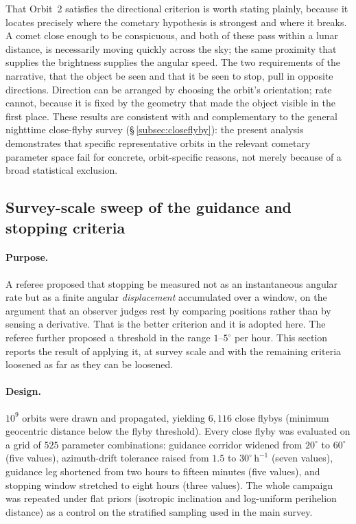 \documentclass[11pt,a4paper]{article}
\begin{document}
That Orbit~2 satisfies the directional criterion is worth stating plainly,
because it locates precisely where the cometary hypothesis is strongest and
where it breaks.  A comet close enough to be conspicuous, and both of these
pass within a lunar distance, is necessarily moving quickly across the sky;
the same proximity that supplies the brightness supplies the angular speed.
The two requirements of the narrative, that the object be seen and that it
be seen to stop, pull in opposite directions.  Direction can be arranged by
choosing the orbit's orientation; rate cannot, because it is fixed by the
geometry that made the object visible in the first place.
These results are consistent with and complementary to the general
nighttime close-flyby survey (\S\,\ref{subsec:closeflyby}):
the present analysis demonstrates that specific representative orbits in
the relevant cometary parameter space fail for concrete, orbit-specific
reasons, not merely because of a broad statistical exclusion.

\subsection{Survey-scale sweep of the guidance and stopping criteria}
\label{subsec:sweep}

\paragraph{Purpose.}
A referee proposed that stopping be measured not as an instantaneous angular
rate but as a finite angular \emph{displacement} accumulated over a window, on
the argument that an observer judges rest by comparing positions rather than by
sensing a derivative. That is the better criterion and it is adopted here. The
referee further proposed a threshold in the range $1$--$5^\circ$ per hour. This
section reports the result of applying it, at survey scale and with the
remaining criteria loosened as far as they can be loosened.

\paragraph{Design.}
$10^{9}$ orbits were drawn and propagated, yielding $6{,}116$ close flybys
(minimum geocentric distance below the flyby threshold). Every close flyby was
evaluated on a grid of $525$ parameter combinations: guidance corridor widened
from $20^\circ$ to $60^\circ$ (five values), azimuth-drift tolerance raised from
$1.5$ to $30^\circ\,\mathrm{h}^{-1}$ (seven values), guidance leg shortened from
two hours to fifteen minutes (five values), and stopping window stretched to
eight hours (three values). The whole campaign was repeated under flat priors
(isotropic inclination and log-uniform perihelion distance) as a control on
the stratified sampling used in the main survey.
\end{document}
